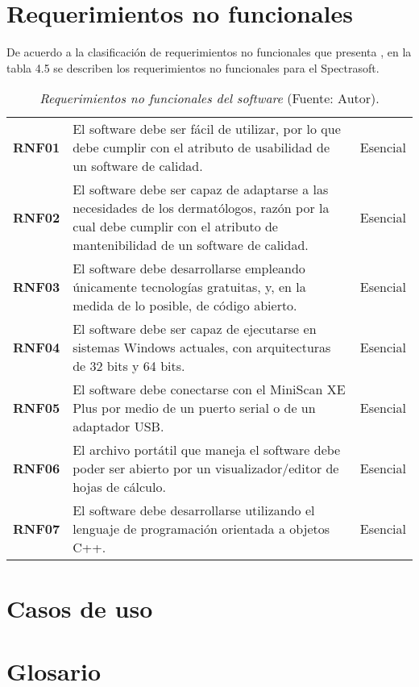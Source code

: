 \section{Requerimientos no funcionales}
	
	De acuerdo a la clasificaci\'{o}n de requerimientos no funcionales que presenta \cite{Sommerville}, en la tabla 4.5 se describen los requerimientos no funcionales para el Spectrasoft.
	
	\begin{table}[h]
		\small
		\caption[Requerimientos no funcionales del software]{\textit{Requerimientos no funcionales del software} (Fuente: Autor).}
		\centering
		\setlength{\extrarowheight}{\altocelda}
		\begin{tabulary}{\anchotabla}{|c|J|c|}
			\hline
			 &  & \\ \hline
			\textbf{RNF01} & El software debe ser f\'{a}cil de utilizar, por lo que debe cumplir con el atributo de usabilidad de un software de calidad. & Esencial\\ \hline
			\textbf{RNF02} & El software debe ser capaz de adaptarse a las necesidades de los dermat\'{o}logos, raz\'{o}n por la cual debe cumplir con el atributo de mantenibilidad de un software de calidad. & Esencial\\ \hline
			\textbf{RNF03} & El software debe desarrollarse empleando \'{u}nicamente tecnolog\'{i}as gratuitas, y, en la medida de lo posible, de c\'{o}digo abierto. & Esencial\\ \hline
			\textbf{RNF04} & El software debe ser capaz de ejecutarse en sistemas Windows actuales, con arquitecturas de 32 bits y 64 bits. & Esencial\\ \hline
			\textbf{RNF05} & El software debe conectarse con el MiniScan XE Plus por medio de un puerto serial o de un adaptador USB. & Esencial\\ \hline
			\textbf{RNF06} & El archivo port\'{a}til que maneja el software debe poder ser abierto por un visualizador/editor de hojas de c\'{a}lculo. & Esencial\\ \hline
			\textbf{RNF07} & El software debe desarrollarse utilizando el lenguaje de programaci\'{o}n orientada a objetos C++. & Esencial\\ \hline
		\end{tabulary}
	\end{table}

\section{Casos de uso}

\section{Glosario}
